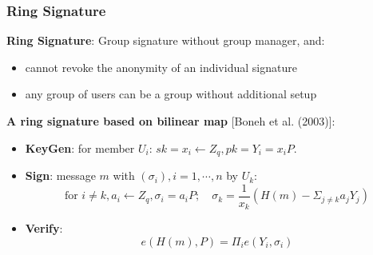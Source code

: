 \begin{frame}\frametitle{Ring Signature}
\textbf{Ring Signature}: Group signature without group manager, and:
\begin{itemize}
\item cannot revoke the anonymity of an individual signature
\item any group of users can be a group without additional setup
\end{itemize}
\textbf{A ring signature based on bilinear map} [Boneh et al. (2003)]:\\
\begin{itemize}
\item \textbf{KeyGen}: for member $U_i$: $sk=x_i \gets Z_q, pk = Y_i = x_iP$.
\item \textbf{Sign}: message $m$ with $(\sigma_i), i=1,\cdots, n$ by $U_k$:
\[\text{for } i\neq k, a_i \gets Z_q, \sigma_i = a_iP;\quad \sigma_k = \frac{1}{x_k}(H(m)-\Sigma_{j\neq k}a_jY_j)\]
\item \textbf{Verify}:
\[ e(H(m),P) = \Pi_ie(Y_i, \sigma_i) \]
\end{itemize}
\end{frame}
